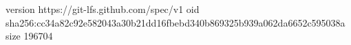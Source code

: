 version https://git-lfs.github.com/spec/v1
oid sha256:cc34a82c92e582043a30b21dd16fbebd340b869325b939a062da6652c595038a
size 196704
